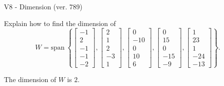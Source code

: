\begin{exercise}
  \begin{exerciseTitle}V8 - Dimension (ver. 789)\end{exerciseTitle}
  \begin{exerciseStatement}
    Explain how to find the dimension of 
\[W=\mathrm{span}\ \left\{\left[\begin{array}{r}
-1 \\
2 \\
-1 \\
-1 \\
-2
\end{array}\right] , \left[\begin{array}{r}
2 \\
1 \\
2 \\
-3 \\
1
\end{array}\right] , \left[\begin{array}{r}
0 \\
-10 \\
0 \\
10 \\
6
\end{array}\right] , \left[\begin{array}{r}
0 \\
15 \\
0 \\
-15 \\
-9
\end{array}\right] , \left[\begin{array}{r}
1 \\
23 \\
1 \\
-24 \\
-13
\end{array}\right]\right\}.\]



  \end{exerciseStatement}
  \begin{exerciseAnswer}
   The dimension of \(W\) is  \(2\).
  


  \end{exerciseAnswer}
\end{exercise}